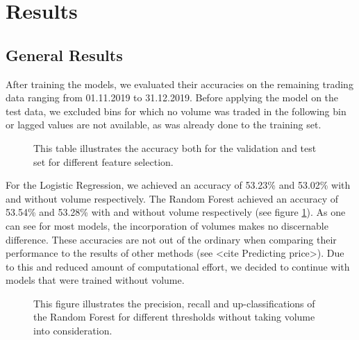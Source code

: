\section{Results}

\subsection{General Results}
After training the models, we evaluated their accuracies on the remaining trading data ranging from 01.11.2019 to 31.12.2019.
Before applying the model on the test data, we excluded bins for which no volume was traded 
in the following bin or lagged values are not available, as was already done to the training set.

\begin{figure}[H]
    \captionsetup{format=plain}
    \caption{ 
        This table illustrates the accuracy both for the validation and test set for different feature selection. 
    }
    \label{stats:training_results}
\end{figure}

For the Logistic Regression, we achieved an accuracy of 53.23\% and 53.02\% with and without volume respectively.
The Random Forest achieved an accuracy of 53.54\% and 53.28\% with and without volume respectively (see figure \ref{stats:training_results}).
As one can see for most models, the incorporation of volumes makes no discernable difference.
These accuracies are not out of the ordinary when comparing their performance to the results of other methods (see <cite Predicting price>).
Due to this and reduced amount of computational effort, we decided to continue with models that were trained
without volume.


\begin{figure}[H]
    \captionsetup{format=plain}
    \caption{ 
            This figure illustrates the precision, recall and up-classifications of the Random Forest for different thresholds
            without taking volume into consideration. 
        }
    \label{fig:rf_precision_vs_threshold}
\end{figure}


